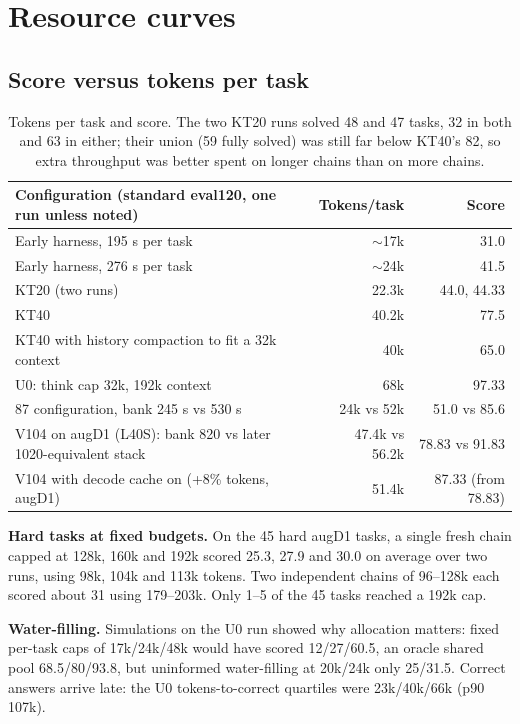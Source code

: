 \section{Resource curves}\label{app:resource}

\subsection{Score versus tokens per task}
\begin{table}[H]\centering\small
\begin{tabularx}{\linewidth}{@{}Xrr@{}}
\toprule
Configuration (standard eval120, one run unless noted) & Tokens/task & Score \\
\midrule
Early harness, 195 s per task & $\sim$17k & 31.0 \\
Early harness, 276 s per task & $\sim$24k & 41.5 \\
KT20 (two runs) & 22.3k & 44.0, 44.33 \\
KT40 & 40.2k & 77.5 \\
KT40 with history compaction to fit a 32k context & 40k & 65.0 \\
U0: think cap 32k, 192k context & 68k & 97.33 \\
87 configuration, bank 245 s vs 530 s & 24k vs 52k & 51.0 vs 85.6 \\
V104 on augD1 (L40S): bank 820 vs later 1020-equivalent stack & 47.4k vs 56.2k & 78.83 vs 91.83 \\
V104 with decode cache on (+8\% tokens, augD1) & 51.4k & 87.33 (from 78.83) \\
\bottomrule
\end{tabularx}
\caption{Tokens per task and score. The two KT20 runs solved 48 and 47 tasks, 32 in both and 63 in either; their union (59 fully solved) was still far below KT40's 82, so extra throughput was better spent on longer chains than on more chains.}
\end{table}

\textbf{Hard tasks at fixed budgets.} On the 45 hard augD1 tasks, a single fresh chain capped at 128k, 160k and 192k scored 25.3, 27.9 and 30.0 on average over two runs, using 98k, 104k and 113k tokens. Two independent chains of 96--128k each scored about 31 using 179--203k. Only 1--5 of the 45 tasks reached a 192k cap.

\textbf{Water-filling.} Simulations on the U0 run showed why allocation matters: fixed per-task caps of 17k/24k/48k would have scored 12/27/60.5, an oracle shared pool 68.5/80/93.8, but uninformed water-filling at 20k/24k only 25/31.5. Correct answers arrive late: the U0 tokens-to-correct quartiles were 23k/40k/66k (p90 107k).

